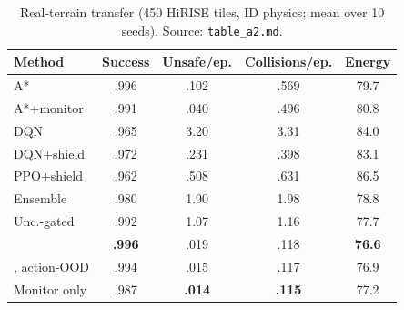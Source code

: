 \begin{table}[t]
\centering
\caption{Real-terrain transfer (450 HiRISE tiles, ID physics; mean over 10 seeds). Source: \texttt{table\_a2.md}.}
\label{tab:real}
\footnotesize
\setlength{\tabcolsep}{3pt}
\begin{tabular}{@{}lcccc@{}}
\toprule
Method & Success & Unsafe/ep. & Collisions/ep. & Energy \\ \midrule
A*                 & .996 & .102 & .569 & 79.7 \\
A*+monitor         & .991 & .040 & .496 & 80.8 \\
DQN                & .965 & 3.20 & 3.31 & 84.0 \\
DQN+shield         & .972 & .231 & .398 & 83.1 \\
PPO+shield         & .962 & .508 & .631 & 86.5 \\
Ensemble           & .980 & 1.90 & 1.98 & 78.8 \\
Unc.-gated         & .992 & 1.07 & 1.16 & 77.7 \\
\ours{}            & \textbf{.996} & .019 & .118 & \textbf{76.6} \\
\ours{}, action-OOD & .994 & .015 & .117 & 76.9 \\
Monitor only       & .987 & \textbf{.014} & \textbf{.115} & 77.2 \\ \bottomrule
\end{tabular}
\end{table}
